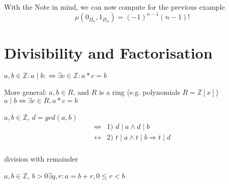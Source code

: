 With the Note in mind, we can now compute for the previous example
\[
    \mu( 0_{\Pi_n}, 1_{\Pi_n}) = (-1)^{n-1} (n-1)!
\]



\section{Divisibility and Factorisation}

\begin{definition}
$a,b \in \mathbb{Z}: a\mid b: \Leftrightarrow \exists c \in \mathbb{Z}: a * c = b$

More general: 
$a,b \in R$, and $R$ is a ring (e.g. polynomials $R = \mathbb{Z}[x]$)
    $a \mid b \Leftrightarrow \exists c \in R , a * c = b$
\end{definition}

\begin{definition}
$a,b \in \mathbb{Z}$, $d = gcd(a,b)$
\begin{align*}
    \Leftrightarrow & \text{1) } d \mid a \wedge d \mid b \\
    \leftrightarrow & \text{2) } t \mid a \wedge t \mid b \Rightarrow t \mid d \\
\end{align*}
\end{definition}

\begin{definition}
division with remainder

$a,b \in \mathbb{Z}$, $b > 0  \exists q,r: a = b  + r, 0 \leq r < b$
\end{definition}



